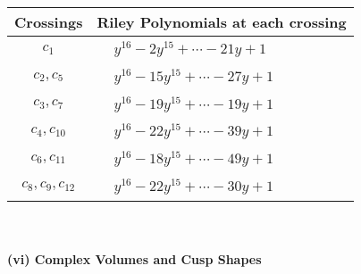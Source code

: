 \documentclass[1p]{elsarticle_modified}
\theoremstyle{definition}
\begin{document}
\begin{tabular}{m{50pt}|m{274pt}}
Crossings & \hspace{64pt}Riley Polynomials at each crossing \\
\hline $$\begin{aligned}c_{1}\end{aligned}$$&$\begin{aligned}
&y^{16}-2 y^{15}+\cdots-21 y+1
\end{aligned}$\\
\hline $$\begin{aligned}c_{2},c_{5}\end{aligned}$$&$\begin{aligned}
&y^{16}-15 y^{15}+\cdots-27 y+1
\end{aligned}$\\
\hline $$\begin{aligned}c_{3},c_{7}\end{aligned}$$&$\begin{aligned}
&y^{16}-19 y^{15}+\cdots-19 y+1
\end{aligned}$\\
\hline $$\begin{aligned}c_{4},c_{10}\end{aligned}$$&$\begin{aligned}
&y^{16}-22 y^{15}+\cdots-39 y+1
\end{aligned}$\\
\hline $$\begin{aligned}c_{6},c_{11}\end{aligned}$$&$\begin{aligned}
&y^{16}-18 y^{15}+\cdots-49 y+1
\end{aligned}$\\
\hline $$\begin{aligned}c_{8},c_{9},c_{12}\end{aligned}$$&$\begin{aligned}
&y^{16}-22 y^{15}+\cdots-30 y+1
\end{aligned}$\\
\hline
\end{tabular}\\~\\
\newpage\flushleft \textbf{(vi) Complex Volumes and Cusp Shapes}
\end{document}
